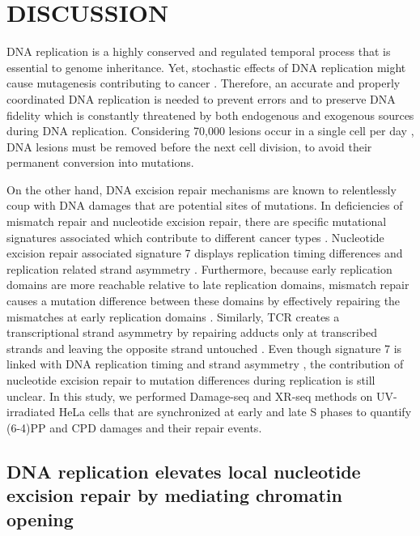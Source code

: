 \setlength{\parindent}{0pt}
\chapter{\bf DISCUSSION}

DNA replication is a highly conserved and regulated temporal process that is essential to genome inheritance. Yet, stochastic effects of DNA replication might cause mutagenesis contributing to cancer \cite{tomasetti2015variation}. Therefore, an accurate and properly coordinated DNA replication is needed to prevent errors and to preserve DNA fidelity which is constantly threatened by both endogenous and exogenous sources during DNA replication. Considering 70,000 lesions occur in a single cell per day \citep{lindahl2000repair}, DNA lesions must be removed before the next cell division, to avoid their permanent conversion into mutations. 

On the other hand, DNA excision repair mechanisms are known to relentlessly coup with DNA damages that are potential sites of mutations. In deficiencies of mismatch repair and nucleotide excision repair, there are specific mutational signatures associated which contribute to different cancer types \citep{helleday2014mechanisms}. Nucleotide excision repair associated signature 7 displays replication timing differences and replication related strand asymmetry \citep{tomkova2018mutational}. Furthermore, because early replication domains are more reachable relative to late replication domains, mismatch repair causes a mutation difference between these domains by effectively repairing the mismatches at early replication domains \citep{supek2015differential}. Similarly, TCR creates a transcriptional strand asymmetry by repairing adducts only at transcribed strands and leaving the opposite strand untouched \citep{zheng2014transcription}. Even though signature 7 is linked with DNA replication timing and strand asymmetry \citep{tomkova2018mutational}, the contribution of nucleotide excision repair to mutation differences during replication is still unclear. In this study, we performed Damage-seq and XR-seq methods on UV-irradiated HeLa cells that are synchronized at early and late S phases to quantify (6-4)PP and CPD damages and their repair events. 

\section{DNA replication elevates local nucleotide excision repair by mediating chromatin opening}

